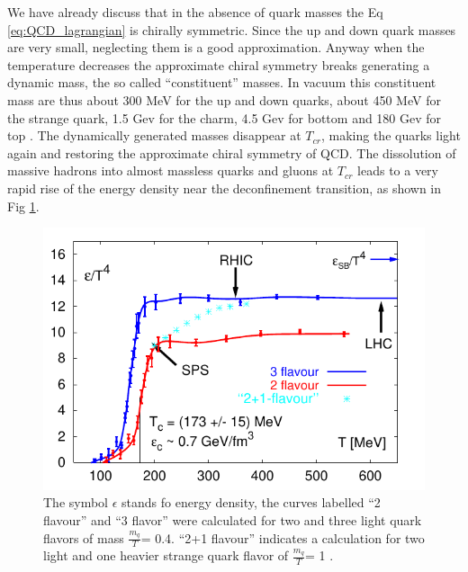 \documentclass[12pt,a4paper]{book}
\begin{document}
	We have already discuss that in the absence of quark masses the Eq \ref{eq:QCD_lagrangian} is chirally symmetric. Since the up and down quark masses are very small, neglecting them is a good approximation. Anyway when the temperature decreases the approximate chiral symmetry breaks generating a dynamic mass, the so called “constituent” masses. In vacuum this constituent mass are thus about 300 MeV for the up and down quarks, about 450 MeV for the strange quark, 1.5 Gev for the charm, 4.5 Gev for bottom and 180 Gev for top \cite{Semprini}. The dynamically generated masses disappear at $T_{cr}$, making the quarks light again and restoring the approximate chiral symmetry of QCD. The dissolution of massive hadrons into almost massless quarks and gluons at $T_{cr}$ leads to a very rapid rise of the energy density near the deconfinement transition, as shown in Fig \ref{fig:deconfinement}.
	\begin{figure}[ht]
		\centering
		\includegraphics[width=0.7\linewidth]{pictures/deconfinement.png}
		\caption{The symbol $\epsilon$ stands fo energy density, the curves labelled “2 flavour” and “3 flavor” were calculated for two and three light quark flavors of mass
			$\frac{m_q}{T}$= 0.4.  “2+1 flavour” indicates a calculation for two light and one heavier strange quark flavor of $\frac{m_q}{T}$= 1 \cite{Herrmann:2920632}.}
		\label{fig:deconfinement} 
	\end{figure}
\end{document}
